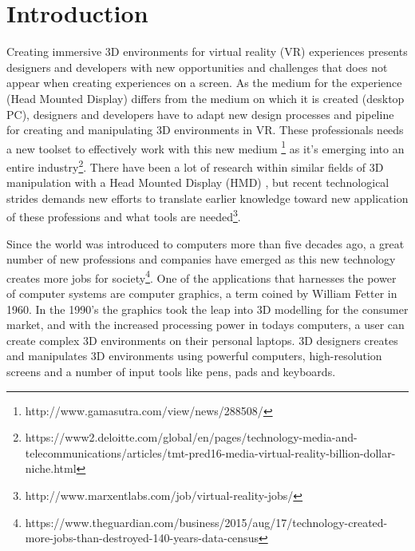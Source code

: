 
\chapter{Introduction}
Creating immersive 3D environments for virtual reality (VR) experiences presents designers and developers with new opportunities and challenges that does not appear when creating experiences on a screen. As the medium for the experience (Head Mounted Display) differs from the medium on which it is created (desktop PC), designers and developers have to adapt new design processes and pipeline for creating and manipulating 3D environments in VR. These professionals needs a new toolset to effectively work with this new medium \footnote{http://www.gamasutra.com/view/news/288508/} as it's emerging into an entire industry\footnote{https://www2.deloitte.com/global/en/pages/technology-media-and-telecommunications/articles/tmt-pred16-media-virtual-reality-billion-dollar-niche.html}. There have been a lot of research within similar fields of 3D manipulation with a Head Mounted Display (HMD)  \cite{relatedwork:kijimaand1997transition} \cite{relatedwork:bowman1996conceptual} \cite{relatedwork:stoakley1995virtual} \cite{relatedwork:mine1995isaac}, but recent technological strides demands new efforts to translate earlier knowledge toward new application of these professions and what tools are needed\footnote{http://www.marxentlabs.com/job/virtual-reality-jobs/}.

Since the world was introduced to computers more than five decades ago, a great number of new professions and companies have emerged as this new technology creates more jobs for society\footnote{https://www.theguardian.com/business/2015/aug/17/technology-created-more-jobs-than-destroyed-140-years-data-census}. One of the applications that harnesses the power of computer systems are computer graphics, a term coined by William Fetter in 1960\cite{3D_history:graphics_2017}. In the 1990's the graphics took the leap into 3D modelling for the consumer market, and with the increased processing power in todays computers, a user can create complex 3D environments on their personal laptops. 3D designers creates and manipulates 3D environments using powerful computers, high-resolution screens and a number of input tools like pens, pads and keyboards.


